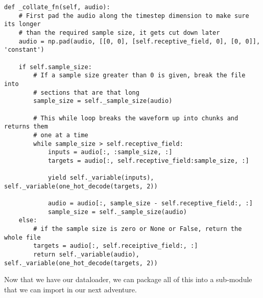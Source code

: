 \begin{verbatim}
def _collate_fn(self, audio):
    # First pad the audio along the timestep dimension to make sure its longer
    # than the required sample size, it gets cut down later
    audio = np.pad(audio, [[0, 0], [self.receptive_field, 0], [0, 0]], 'constant')

    if self.sample_size:
        # If a sample size greater than 0 is given, break the file into
        # sections that are that long
        sample_size = self._sample_size(audio)

        # This while loop breaks the waveform up into chunks and returns them
        # one at a time
        while sample_size > self.receptive_field:
            inputs = audio[:, :sample_size, :]
            targets = audio[:, self.receptive_field:sample_size, :]

            yield self._variable(inputs), self._variable(one_hot_decode(targets, 2))

            audio = audio[:, sample_size - self.receptive_field:, :]
            sample_size = self._sample_size(audio)
    else:
        # if the sample size is zero or None or False, return the whole file
        targets = audio[:, self.receiptive_field:, :]
        return self._variable(audio), self._variable(one_hot_decode(targets, 2))
\end{verbatim}

Now that we have our dataloader, we can package all of this into a sub-module that we can import in our next adventure.

